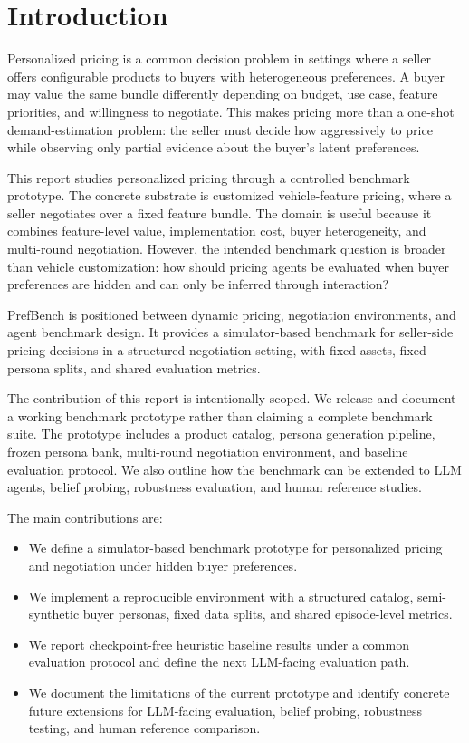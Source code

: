 \section{Introduction}
\label{sec:introduction}

Personalized pricing is a common decision problem in settings where a seller offers configurable products to buyers with heterogeneous preferences. A buyer may value the same bundle differently depending on budget, use case, feature priorities, and willingness to negotiate. This makes pricing more than a one-shot demand-estimation problem: the seller must decide how aggressively to price while observing only partial evidence about the buyer's latent preferences.

This report studies personalized pricing through a controlled benchmark prototype. The concrete substrate is customized vehicle-feature pricing, where a seller negotiates over a fixed feature bundle. The domain is useful because it combines feature-level value, implementation cost, buyer heterogeneity, and multi-round negotiation. However, the intended benchmark question is broader than vehicle customization: how should pricing agents be evaluated when buyer preferences are hidden and can only be inferred through interaction?

PrefBench is positioned between dynamic pricing, negotiation environments, and agent benchmark design. It provides a simulator-based benchmark for seller-side pricing decisions in a structured negotiation setting, with fixed assets, fixed persona splits, and shared evaluation metrics.

The contribution of this report is intentionally scoped. We release and document a working benchmark prototype rather than claiming a complete benchmark suite. The prototype includes a product catalog, persona generation pipeline, frozen persona bank, multi-round negotiation environment, and baseline evaluation protocol. We also outline how the benchmark can be extended to LLM agents, belief probing, robustness evaluation, and human reference studies.

The main contributions are:
\begin{itemize}
  \item We define a simulator-based benchmark prototype for personalized pricing and negotiation under hidden buyer preferences.
  \item We implement a reproducible environment with a structured catalog, semi-synthetic buyer personas, fixed data splits, and shared episode-level metrics.
  \item We report checkpoint-free heuristic baseline results under a common evaluation protocol and define the next LLM-facing evaluation path.
  \item We document the limitations of the current prototype and identify concrete future extensions for LLM-facing evaluation, belief probing, robustness testing, and human reference comparison.
\end{itemize}
